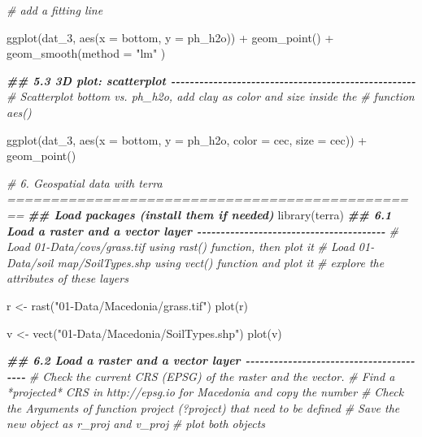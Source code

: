 \documentclass[
  10pt,
  b5paper,
  oneside]{book}
\newenvironment{Shaded}{\begin{snugshade}}{\end{snugshade}}
\newcommand{\AttributeTok}[1]{\textcolor[rgb]{0.77,0.63,0.00}{#1}}
\newcommand{\CommentTok}[1]{\textcolor[rgb]{0.56,0.35,0.01}{\textit{#1}}}
\newcommand{\DocumentationTok}[1]{\textcolor[rgb]{0.56,0.35,0.01}{\textbf{\textit{#1}}}}
\newcommand{\FunctionTok}[1]{\textcolor[rgb]{0.00,0.00,0.00}{#1}}
\newcommand{\NormalTok}[1]{#1}
\newcommand{\OtherTok}[1]{\textcolor[rgb]{0.56,0.35,0.01}{#1}}
\newcommand{\SpecialCharTok}[1]{\textcolor[rgb]{0.00,0.00,0.00}{#1}}
\newcommand{\StringTok}[1]{\textcolor[rgb]{0.31,0.60,0.02}{#1}}
\begin{document}
\begin{Shaded}
\begin{Highlighting}[]
\CommentTok{\# add a fitting line}

\FunctionTok{ggplot}\NormalTok{(dat\_3, }\FunctionTok{aes}\NormalTok{(}\AttributeTok{x =}\NormalTok{ bottom, }\AttributeTok{y =}\NormalTok{ ph\_h2o)) }\SpecialCharTok{+} 
  \FunctionTok{geom\_point}\NormalTok{() }\SpecialCharTok{+}
  \FunctionTok{geom\_smooth}\NormalTok{(}\AttributeTok{method =} \StringTok{"lm"}\NormalTok{ )}

\DocumentationTok{\#\# 5.3 3D plot: scatterplot {-}{-}{-}{-}{-}{-}{-}{-}{-}{-}{-}{-}{-}{-}{-}{-}{-}{-}{-}{-}{-}{-}{-}{-}{-}{-}{-}{-}{-}{-}{-}{-}{-}{-}{-}{-}{-}{-}{-}{-}{-}{-}{-}{-}{-}{-}{-}{-}{-}{-}{-}{-}}
\CommentTok{\# Scatterplot bottom vs. ph\_h2o, add clay as color and size inside the }
\CommentTok{\# function aes()}

\FunctionTok{ggplot}\NormalTok{(dat\_3, }\FunctionTok{aes}\NormalTok{(}\AttributeTok{x =}\NormalTok{ bottom, }\AttributeTok{y =}\NormalTok{ ph\_h2o, }\AttributeTok{color =}\NormalTok{ cec, }\AttributeTok{size =}\NormalTok{ cec)) }\SpecialCharTok{+} 
  \FunctionTok{geom\_point}\NormalTok{()}

\CommentTok{\# 6. Geospatial data with terra ================================================}
\DocumentationTok{\#\# Load packages (install them if needed)}
\FunctionTok{library}\NormalTok{(terra)}
\DocumentationTok{\#\# 6.1 Load a raster and a vector layer {-}{-}{-}{-}{-}{-}{-}{-}{-}{-}{-}{-}{-}{-}{-}{-}{-}{-}{-}{-}{-}{-}{-}{-}{-}{-}{-}{-}{-}{-}{-}{-}{-}{-}{-}{-}{-}{-}{-}{-}}
\CommentTok{\# Load 01{-}Data/covs/grass.tif using rast() function, then plot it}
\CommentTok{\# Load 01{-}Data/soil map/SoilTypes.shp using vect() function and plot it }
\CommentTok{\# explore the attributes of these layers}

\NormalTok{r }\OtherTok{\textless{}{-}} \FunctionTok{rast}\NormalTok{(}\StringTok{"01{-}Data/Macedonia/grass.tif"}\NormalTok{)}
\FunctionTok{plot}\NormalTok{(r)}

\NormalTok{v }\OtherTok{\textless{}{-}} \FunctionTok{vect}\NormalTok{(}\StringTok{"01{-}Data/Macedonia/SoilTypes.shp"}\NormalTok{)}
\FunctionTok{plot}\NormalTok{(v)}

\DocumentationTok{\#\# 6.2 Load a raster and a vector layer {-}{-}{-}{-}{-}{-}{-}{-}{-}{-}{-}{-}{-}{-}{-}{-}{-}{-}{-}{-}{-}{-}{-}{-}{-}{-}{-}{-}{-}{-}{-}{-}{-}{-}{-}{-}{-}{-}{-}{-}}
\CommentTok{\# Check the current CRS (EPSG) of the raster and the vector. }
\CommentTok{\# Find a *projected* CRS in http://epsg.io for Macedonia and copy the number}
\CommentTok{\# Check the Arguments of function project (?project) that need to be defined}
\CommentTok{\# Save the new object as r\_proj and v\_proj}
\CommentTok{\# plot both objects}


\end{Highlighting}
\end{Shaded}
\end{document}
